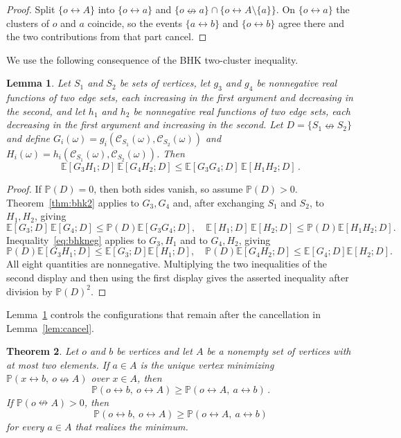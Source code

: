 \documentclass[11pt]{article}
\newtheorem{theorem}{Theorem}[section]
\newtheorem{lemma}[theorem]{Lemma}
\theoremstyle{definition}
\theoremstyle{remark}
\newcommand{\PP}{\mathbb P}
\newcommand{\EE}{\mathbb E}
\newcommand{\con}{\leftrightarrow}
\newcommand{\ncon}{\nleftrightarrow}
\newcommand{\eC}{\mathcal C}
\begin{document}
\begin{proof}
Split $\{o\con A\}$ into $\{o\con a\}$ and $\{o\ncon a\}\cap\{o\con A\setminus\{a\}\}$. On
$\{o\con a\}$ the clusters of $o$ and $a$ coincide, so the events $\{a\con b\}$ and
$\{o\con b\}$ agree there and the two contributions from that part cancel.
\end{proof}

We use the following consequence of the BHK two-cluster inequality.

\begin{lemma}\label{lem:exch}
Let $S_1$ and $S_2$ be sets of vertices, let $g_3$ and $g_4$ be nonnegative real functions
of two edge sets, each increasing in the first argument and decreasing in the second, and
let $h_1$ and $h_2$ be nonnegative real functions of two edge sets, each decreasing in the
first argument and increasing in the second. Let $D=\{S_1\ncon S_2\}$ and define
$G_i(\omega)=g_i(\eC_{S_1}(\omega),\eC_{S_2}(\omega))$ and
$H_i(\omega)=h_i(\eC_{S_1}(\omega),\eC_{S_2}(\omega))$. Then
\[
 \EE[G_3H_1;D]\,\EE[G_4H_2;D]
 \leq \EE[G_3G_4;D]\,\EE[H_1H_2;D]\,.
\]
\end{lemma}

\begin{proof}
If $\PP(D)=0$, then both sides vanish, so assume $\PP(D)>0$.
Theorem~\ref{thm:bhk2} applies to $G_3,G_4$ and, after exchanging
$S_1$ and $S_2$, to $H_1,H_2$, giving
\[
 \EE[G_3;D]\,\EE[G_4;D]\leq\PP(D)\EE[G_3G_4;D],
 \quad
 \EE[H_1;D]\,\EE[H_2;D]\leq\PP(D)\EE[H_1H_2;D].
\]
Inequality~\eqref{eq:bhkneg} applies to $G_3,H_1$ and to $G_4,H_2$, giving
\[
 \PP(D)\EE[G_3H_1;D]\leq\EE[G_3;D]\EE[H_1;D],
 \quad
 \PP(D)\EE[G_4H_2;D]\leq\EE[G_4;D]\EE[H_2;D].
\]
All eight quantities are nonnegative. Multiplying the two inequalities of the second
display and then using the first display gives the asserted inequality after division by
$\PP(D)^2$.
\end{proof}

Lemma~\ref{lem:exch} controls the configurations that remain after the cancellation in
Lemma~\ref{lem:cancel}.

\begin{theorem}\label{thm:q8two}
Let $o$ and $b$ be vertices and let $A$ be a nonempty set of vertices with at most two
elements. If $a\in A$ is the unique vertex minimizing $\PP(x\con b,\ o\ncon A)$ over
$x\in A$, then
\[
 \PP(o\con b,\ o\con A)\geq\PP(o\con A,\ a\con b)\,.
\]
If $\PP(o\ncon A)>0$, then
\[
 \PP(o\con b,\ o\con A)\geq\PP(o\con A,\ a\con b)
\]
for every $a\in A$ that realizes the minimum.
\end{theorem}
\end{document}

